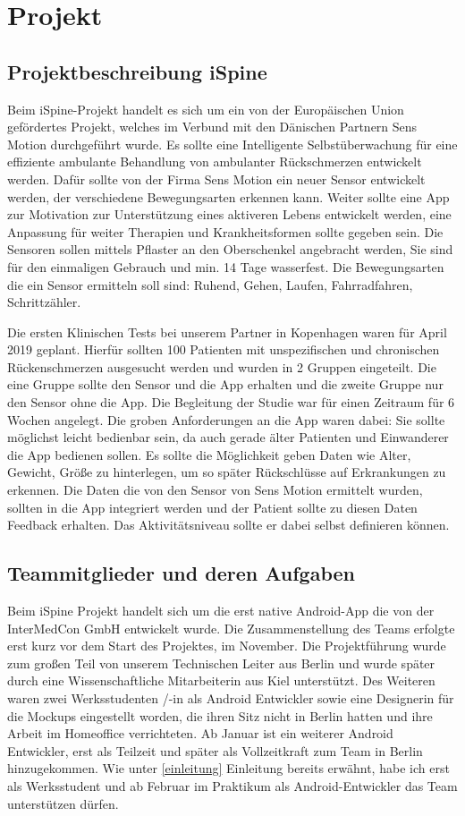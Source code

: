 \chapter{Projekt}
\section{Projektbeschreibung iSpine}\label{beschreibung}
Beim iSpine-Projekt handelt es sich um ein von der Europäischen Union gefördertes Projekt, welches im Verbund mit den Dänischen Partnern Sens Motion durchgeführt wurde. Es sollte eine Intelligente Selbstüberwachung für eine effiziente ambulante Behandlung von ambulanter Rückschmerzen entwickelt werden. Dafür sollte von der Firma Sens Motion ein neuer Sensor entwickelt werden, der verschiedene Bewegungsarten erkennen kann. Weiter sollte eine App zur Motivation zur Unterstützung eines aktiveren Lebens entwickelt werden, eine Anpassung für weiter Therapien und Krankheitsformen sollte gegeben sein. Die Sensoren sollen mittels Pflaster an den Oberschenkel angebracht werden, Sie sind für den einmaligen Gebrauch und min. 14 Tage wasserfest. Die Bewegungsarten die ein Sensor ermitteln soll sind: Ruhend, Gehen, Laufen, Fahrradfahren, Schrittzähler. 


Die ersten Klinischen Tests bei unserem Partner in Kopenhagen waren für April 2019 geplant. Hierfür sollten 100 Patienten mit unspezifischen und chronischen Rückenschmerzen ausgesucht werden und wurden in 2 Gruppen eingeteilt. Die eine Gruppe sollte den Sensor und die App erhalten und die zweite Gruppe nur den Sensor ohne die App.  Die Begleitung der Studie war für einen Zeitraum für 6 Wochen angelegt. Die groben Anforderungen an die App waren dabei:
Sie sollte möglichst leicht bedienbar sein, da auch gerade älter Patienten und Einwanderer die App bedienen sollen. Es sollte die Möglichkeit geben Daten wie Alter, Gewicht, Größe zu hinterlegen, um so später Rückschlüsse auf Erkrankungen zu erkennen. Die Daten die von den Sensor von Sens Motion ermittelt wurden, sollten in die App integriert werden und der Patient sollte zu diesen Daten Feedback erhalten. Das Aktivitätsniveau sollte er dabei selbst definieren können.


\section{Teammitglieder und deren Aufgaben}\label{team}
Beim iSpine Projekt handelt sich um die erst native Android-App die von der InterMedCon GmbH entwickelt wurde. Die Zusammenstellung des Teams erfolgte erst kurz vor dem Start des Projektes, im November. Die Projektführung wurde zum großen Teil von unserem Technischen Leiter aus Berlin und wurde später durch eine Wissenschaftliche Mitarbeiterin aus Kiel unterstützt. Des Weiteren waren zwei Werksstudenten /-in als Android Entwickler sowie eine Designerin für die Mockups eingestellt worden, die ihren Sitz nicht in Berlin hatten und ihre Arbeit im Homeoffice verrichteten. Ab Januar ist ein weiterer Android Entwickler, erst als Teilzeit und später als Vollzeitkraft zum Team in Berlin hinzugekommen. Wie unter \ref*{einleitung} Einleitung bereits erwähnt, habe ich erst als Werksstudent und ab Februar im Praktikum als Android-Entwickler das Team unterstützen dürfen. 

